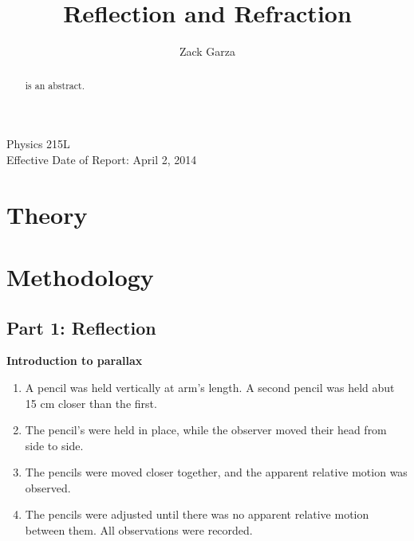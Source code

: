 \documentclass[twocolumn,english]{IEEEtran}
\theoremstyle{plain}
\theoremstyle{plain}
\begin{document}
\title{Reflection and Refraction}


\author{Zack Garza}


\IEEEspecialpapernotice
{Physics 215L \\
Effective Date of Report: April 2, 2014}


\maketitle
\begin{abstract}
 is an abstract.
\end{abstract}
\tableofcontents


\section{Theory}




\section{Methodology}

\subsection*{Part 1: Reflection}

\textbf{Introduction to parallax}
\begin{enumerate}
 \item A pencil was held vertically at arm's length. A second pencil was held abut 15 cm closer than the first.
 \item The pencil's were held in place, while the observer moved their head from side to side.
 \item The pencils were moved closer together, and the apparent relative motion was observed.
 \item The pencils were adjusted until there was no apparent relative motion between them. All observations were recorded.
\end{enumerate}
\end{document}
